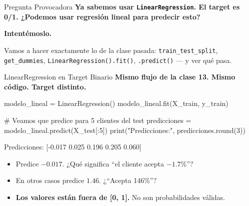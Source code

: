 \documentclass[aspectratio=169, 11pt]{beamer}
\begin{document}
\begin{frame}[shrink=5]{Pregunta Provocadora}
  \vspace{-4pt}
  {\footnotesize\color{arcaDark}\bfseries
    Ya sabemos usar \texttt{LinearRegression}. El target es 0/1.
    ¿Podemos usar regresión lineal para predecir esto?}

  \vspace{10pt}
  \begin{center}
    {\Large\color{arcaRed}\bfseries
      Intentémoslo.}
  \end{center}

  \vspace{10pt}
  {\footnotesize\color{arcaDark}
    Vamos a hacer exactamente lo de la clase pasada:
    \texttt{train\_test\_split}, \texttt{get\_dummies},
    \texttt{LinearRegression().fit()}, \texttt{.predict()}
    --- y ver qué pasa.}
\end{frame}

\begin{frame}[fragile,shrink=35]{LinearRegression en Target Binario}
  \vspace{-6pt}
  {\footnotesize\color{arcaDark}\bfseries
    Mismo flujo de la clase 13. Mismo código. Target distinto.}

  \vspace{4pt}
  \begin{pyblock}
modelo_lineal = LinearRegression()
modelo_lineal.fit(X_train, y_train)

# Veamos que predice para 5 clientes del test
predicciones = modelo_lineal.predict(X_test[:5])
print("Predicciones:", predicciones.round(3))
  \end{pyblock}

  \vspace{4pt}
  \begin{outputblock}
Predicciones: [-0.017  0.025  0.196  0.205  0.060]
  \end{outputblock}

  \vspace{4pt}
  {\scriptsize\color{textMuted}
  \begin{itemize}\setlength{\itemsep}{3pt}
    \item[{\color{codeOrange}\scriptsize\faExclamationTriangle}]
      Predice $-0.017$. ¿Qué significa ``el cliente acepta $-1.7\%$''?
    \item[{\color{codeOrange}\scriptsize\faExclamationTriangle}]
      En otros casos predice $1.46$. ¿``Acepta 146\%''?
    \item[{\color{arcaRed}\scriptsize\faArrowRight}]
      \textbf{Los valores están fuera de [0, 1].} No son probabilidades
      válidas.
  \end{itemize}
  }
\end{frame}
\end{document}
